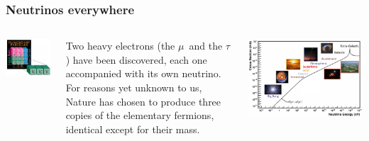 %
%
%
%
%
%
%
%
%
%
\begin{frame}
\frametitle{Neutrinos everywhere}
\begin{columns}
\includegraphics[scale=0.25]{img/Generations2.png}

Two heavy electrons (the $\mu$~and the $\tau$) have been discovered, each one accompanied with its own neutrino. For reasons yet unknown to us, Nature has chosen to produce three copies of the elementary fermions, identical except for their mass. 
 
\includegraphics[scale=0.25]{img/NeutrinoSources.png}


\end{columns}
\end{frame}
